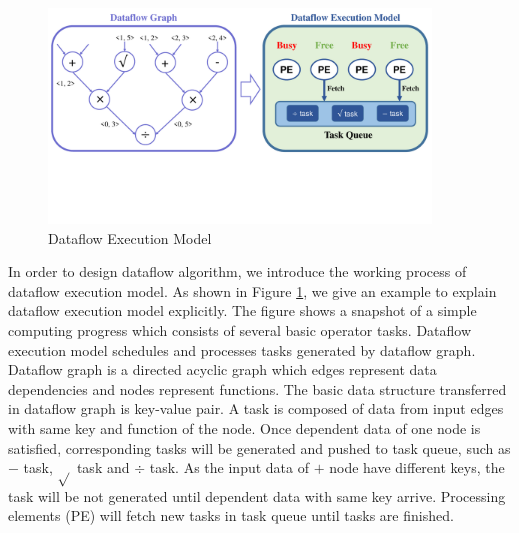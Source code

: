\documentclass{llncs}
\begin{document}
\begin{figure}[!t]
\centering
\includegraphics[width=4in]{pics/dataflowModel.pdf}
\vspace{-60pt}
\caption{Dataflow Execution Model}
\label{fig:dataflowModel}
\vspace{-15pt}
\end{figure}
In order to design dataflow algorithm, we introduce the working process of dataflow execution model. As shown in Figure \ref{fig:dataflowModel}, we give an example to explain dataflow execution model explicitly. The figure shows a snapshot of a simple computing progress which consists of several basic operator tasks. Dataflow execution model schedules and processes tasks generated by dataflow graph. Dataflow graph is a directed acyclic graph which edges represent data dependencies and nodes represent functions. The basic data structure transferred in dataflow graph is key-value pair. A task is composed of data from input edges with same key and function of the node. Once dependent data of one node is satisfied, corresponding tasks will be generated and pushed to task queue, such as $-$ task, $\sqrt{ }$ task and $\div$ task. As the input data of $+$ node have different keys, the task will be not generated until dependent data with same key arrive. Processing elements (PE) will fetch new tasks in task queue until tasks are finished.



\vspace{-10pt}
\end{document}
